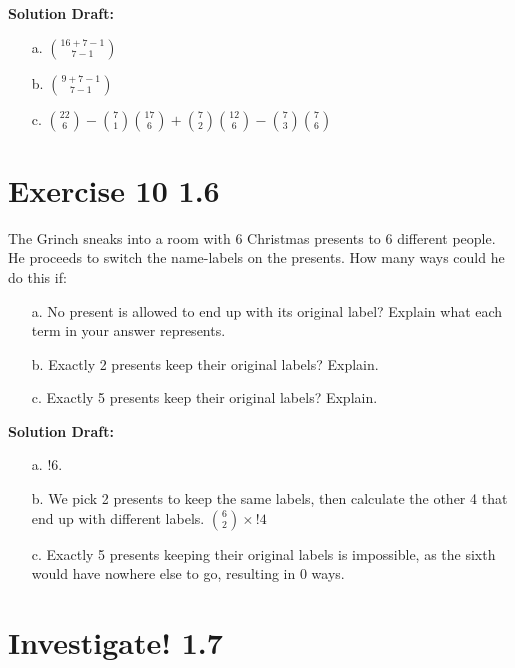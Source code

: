 \documentclass{article}
\begin{document}
\vspace{0.5cm}
\noindent\textbf{Solution Draft:} 
\vspace{0.2cm}

\begin{enumerate}
    \item[a.] \( \binom{16 + 7 - 1}{7 - 1} \)
    \item[b.] \( \binom{9 + 7 - 1}{7 - 1} \)
    \item[c.] \(\binom{22}{6} - \binom{7}{1}\binom{17}{6} + \binom{7}{2}\binom{12}{6} - \binom{7}{3}\binom{7}{6}\)
\end{enumerate}

\section*{Exercise 10 1.6}  

The Grinch sneaks into a room with 6 Christmas presents to 6 different people. He proceeds to switch the name-labels on the presents. How many ways could he do this if:
\begin{enumerate}
    \item[a.] No present is allowed to end up with its original label? Explain what each term in your answer represents.
    \item[b.] Exactly 2 presents keep their original labels? Explain.
    \item[c.] Exactly 5 presents keep their original labels? Explain.
\end{enumerate}

\vspace{0.5cm}
\noindent\textbf{Solution Draft:} 
\vspace{0.2cm}

\begin{enumerate}
    \item[a.] \( !6 \).
    \item[b.] We pick 2 presents to keep the same labels, then calculate the other 4 that end up with different labels. \( \binom{6}{2} \times !4 \)
    \item[c.] Exactly 5 presents keeping their original labels is impossible, as the sixth would have nowhere else to go, resulting in 0 ways.
\end{enumerate}


\section*{Investigate! 1.7}  
\end{document}
